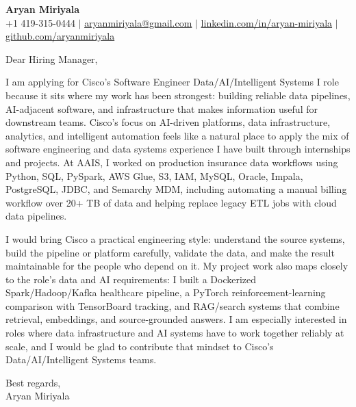 \documentclass[letterpaper,11pt]{article}
\begin{document}
\begin{center}
{\Large \textbf{Aryan Miriyala}}\\
\vspace{2pt}
+1 419-315-0444 $|$ \href{mailto:aryanmiriyala@gmail.com}{aryanmiriyala@gmail.com} $|$
\href{https://www.linkedin.com/in/aryan-miriyala-7788a21b6/}{linkedin.com/in/aryan-miriyala} $|$
\href{https://github.com/aryanmiriyala}{github.com/aryanmiriyala}
\end{center}

\vspace{12pt}

Dear Hiring Manager,

I am applying for Cisco's Software Engineer Data/AI/Intelligent Systems I role because it sits where my work has been strongest: building reliable data pipelines, AI-adjacent software, and infrastructure that makes information useful for downstream teams. Cisco's focus on AI-driven platforms, data infrastructure, analytics, and intelligent automation feels like a natural place to apply the mix of software engineering and data systems experience I have built through internships and projects. At AAIS, I worked on production insurance data workflows using Python, SQL, PySpark, AWS Glue, S3, IAM, MySQL, Oracle, Impala, PostgreSQL, JDBC, and Semarchy MDM, including automating a manual billing workflow over 20+ TB of data and helping replace legacy ETL jobs with cloud data pipelines.

I would bring Cisco a practical engineering style: understand the source systems, build the pipeline or platform carefully, validate the data, and make the result maintainable for the people who depend on it. My project work also maps closely to the role's data and AI requirements: I built a Dockerized Spark/Hadoop/Kafka healthcare pipeline, a PyTorch reinforcement-learning comparison with TensorBoard tracking, and RAG/search systems that combine retrieval, embeddings, and source-grounded answers. I am especially interested in roles where data infrastructure and AI systems have to work together reliably at scale, and I would be glad to contribute that mindset to Cisco's Data/AI/Intelligent Systems teams.

Best regards,\\
Aryan Miriyala
\end{document}
